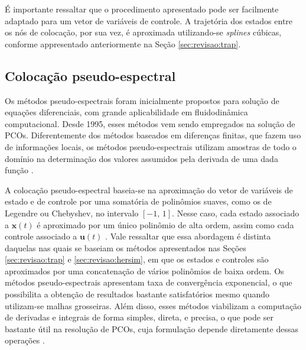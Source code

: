 É importante ressaltar que o procedimento apresentado pode ser facilmente adaptado para um vetor de variáveis de controle. A trajetória dos estados entre os nós de colocação, por sua vez, é aproximada utilizando-se \textit{splines} cúbicas, conforme appresentado anteriormente na  Seção \ref{sec:revisao:trap}. 


\subsection{Colocação pseudo-espectral}


Os métodos pseudo-espectrais foram inicialmente propostos para solução de equações diferenciais, com grande aplicabilidade em fluidodinâmica computacional. Desde 1995, esses métodos vem sendo empregados na solução de PCOs. Diferentemente dos métodos baseados em diferenças finitas, que fazem uso de informações locais, os métodos pseudo-espectrais utilizam amostras de todo o domínio na determinação dos valores assumidos pela derivada de uma dada função \cite{becerra_tutorial_2010}.

A colocação pseudo-espectral baseia-se na aproximação do vetor de variáveis de estado e de controle por uma somatória de polinômios suaves, como os de Legendre ou Chebyshev, no intervalo $ [ -1, \, 1 ] $. Nesse caso, cada estado associado a $ \mathbf{x}(t) $ é aproximado por um único polinômio de alta ordem, assim como cada controle associado a $ \mathbf{u}(t) $ \cite{becerra_psopt_2019}. Vale ressaltar que essa abordagem é distinta daquelas nas quais se baseiam os métodos apresentados nas Seções \ref{sec:revisao:trap} e \ref{sec:revisao:hersim}, em que os estados e controles são aproximados por uma concatenação de vários polinômios de baixa ordem. 
Os métodos pseudo-espectrais apresentam taxa de convergência exponencial, o que possibilita a obtenção de resultados bastante satisfatórios mesmo quando utilizam-se malhas grosseiras. Além disso, esses métodos viabilizam a computação de derivadas e integrais de forma simples, direta, e precisa, o que pode ser bastante útil na resolução de PCOs, cuja formulação depende diretamente dessas operações \cite{becerra_tutorial_2010}. 

